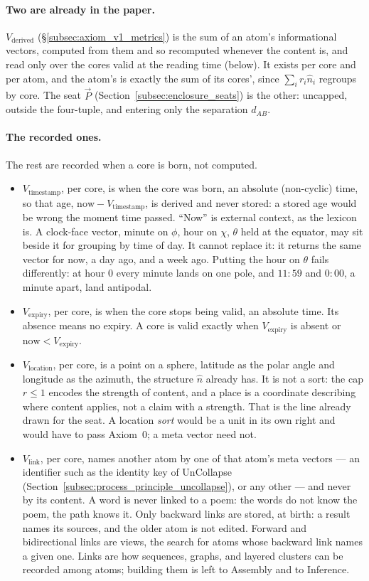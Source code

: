\documentclass[12pt, a4paper]{article}
\begin{document}
\paragraph{Two are already in the paper.} $V_{\text{derived}}$
(\S\ref{subsec:axiom_v1_metrics}) is the sum of an atom's informational
vectors, computed from them and so recomputed whenever the content is, and read
only over the cores valid at the reading time (below).
It exists per core and per atom, and the atom's is exactly the sum of
its cores', since $\sum_i r_i\hat n_i$ regroups by core. The seat
$\vec P$ (Section~\ref{subsec:enclosure_seats}) is the other: uncapped,
outside the four-tuple, and entering only the separation $d_{AB}$.

\paragraph{The recorded ones.} The rest are recorded when a core is
born, not computed.
\begin{itemize}
\item $V_{\text{timestamp}}$, per core, is when the core was born, an
absolute (non-cyclic) time, so that age, $\text{now}-V_{\text{timestamp}}$,
is derived and never stored: a stored age would be wrong the moment time
passed. ``Now'' is external context, as the lexicon is. A clock-face
vector, minute on $\phi$, hour on $\chi$, $\theta$ held at the equator,
may sit beside it for grouping by time of day. It cannot replace it: it
returns the same vector for now, a day ago, and a week ago. Putting the
hour on $\theta$ fails differently: at hour $0$ every minute lands on one
pole, and $11{:}59$ and $0{:}00$, a minute apart, land antipodal.
\item $V_{\text{expiry}}$, per core, is when the core stops being valid,
an absolute time. Its absence means no expiry. A core is valid exactly
when $V_{\text{expiry}}$ is absent or $\text{now}<V_{\text{expiry}}$.
\item $V_{\text{location}}$, per core, is a point on a sphere, latitude as the polar
angle and longitude as the azimuth, the structure $\hat n$ already has.
It is not a sort: the cap $r\le1$ encodes the strength of content, and a
place is a coordinate describing where content applies, not a claim with
a strength. That is the line already drawn for the seat. A location
\emph{sort} would be a unit in its own right and would have to pass
Axiom~0; a meta vector need not.
\item $V_{\text{link}}$, per core, names another atom by one of that atom's meta
vectors --- an identifier such as the identity key of UnCollapse (Section~\ref{subsec:process_principle_uncollapse}), or any other --- and never by its content. A word is never
linked to a poem: the words do not know the poem, the path knows it.
Only backward links are stored, at birth: a result names its sources,
and the older atom is not edited. Forward and bidirectional links are
views, the search for atoms whose backward link names a given one. Links
are how sequences, graphs, and layered clusters can be recorded among
atoms; building them is left to Assembly and to Inference.
\end{itemize}
\end{document}
